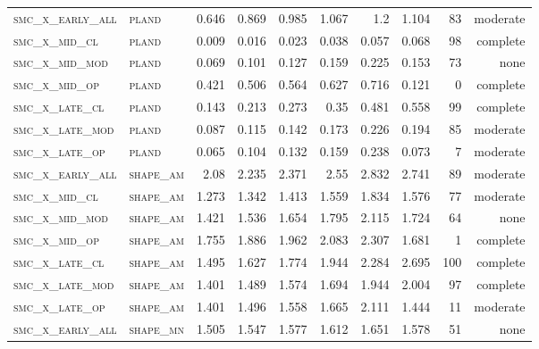 \begin{landscape}
\begin{center}
\begin{footnotesize}
\begin{longtable}{llrrrrr|rrr}
\textsc{smc\_x\_early\_all} & \textsc{pland     }   & 0.646    & 0.869    & 0.985    & 1.067    & 1.2      & 1.104    & 83  & moderate \\
\textsc{smc\_x\_mid\_cl   } & \textsc{pland     }   & 0.009    & 0.016    & 0.023    & 0.038    & 0.057    & 0.068    & 98  & complete \\
\textsc{smc\_x\_mid\_mod  } & \textsc{pland     }   & 0.069    & 0.101    & 0.127    & 0.159    & 0.225    & 0.153    & 73  & none     \\
\textsc{smc\_x\_mid\_op   } & \textsc{pland     }   & 0.421    & 0.506    & 0.564    & 0.627    & 0.716    & 0.121    & 0   & complete \\
\textsc{smc\_x\_late\_cl  } & \textsc{pland     }   & 0.143    & 0.213    & 0.273    & 0.35     & 0.481    & 0.558    & 99  & complete \\
\textsc{smc\_x\_late\_mod } & \textsc{pland     }   & 0.087    & 0.115    & 0.142    & 0.173    & 0.226    & 0.194    & 85  & moderate \\
\textsc{smc\_x\_late\_op  } & \textsc{pland     }   & 0.065    & 0.104    & 0.132    & 0.159    & 0.238    & 0.073    & 7   & moderate \\
\textsc{smc\_x\_early\_all} & \textsc{shape\_am }   & 2.08     & 2.235    & 2.371    & 2.55     & 2.832    & 2.741    & 89  & moderate \\
\textsc{smc\_x\_mid\_cl   } & \textsc{shape\_am }   & 1.273    & 1.342    & 1.413    & 1.559    & 1.834    & 1.576    & 77  & moderate \\
\textsc{smc\_x\_mid\_mod  } & \textsc{shape\_am }   & 1.421    & 1.536    & 1.654    & 1.795    & 2.115    & 1.724    & 64  & none     \\
\textsc{smc\_x\_mid\_op   } & \textsc{shape\_am }   & 1.755    & 1.886    & 1.962    & 2.083    & 2.307    & 1.681    & 1   & complete \\
\textsc{smc\_x\_late\_cl  } & \textsc{shape\_am }   & 1.495    & 1.627    & 1.774    & 1.944    & 2.284    & 2.695    & 100 & complete \\
\textsc{smc\_x\_late\_mod } & \textsc{shape\_am }   & 1.401    & 1.489    & 1.574    & 1.694    & 1.944    & 2.004    & 97  & complete \\
\textsc{smc\_x\_late\_op  } & \textsc{shape\_am }   & 1.401    & 1.496    & 1.558    & 1.665    & 2.111    & 1.444    & 11  & moderate \\
\textsc{smc\_x\_early\_all} & \textsc{shape\_mn }   & 1.505    & 1.547    & 1.577    & 1.612    & 1.651    & 1.578    & 51  & none     \\

\end{longtable}
\end{footnotesize}
\end{center}
\end{landscape}
